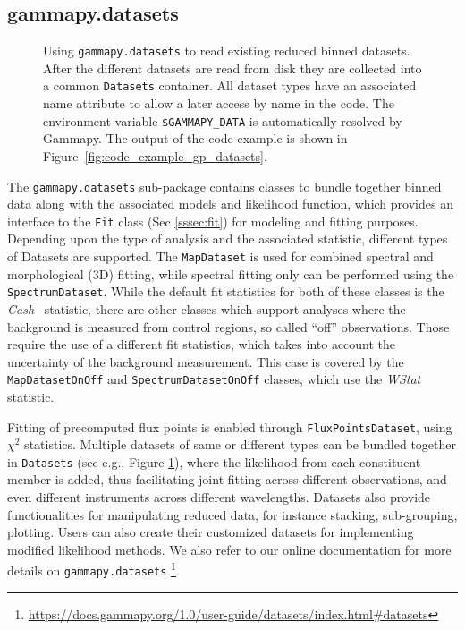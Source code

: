 \documentclass[longauth]{aa}
\newcommand{\code}[1]{\texttt{#1}}
\newcommand{\gammapy}{Gammapy\xspace}
\begin{document}
\subsection{gammapy.datasets}
\label{ssec:gammapy-datasets}
%
\begin{figure}
        \small
        \caption{
        Using \code{gammapy.datasets} to read existing reduced binned datasets.
        After the different datasets are read from disk they are collected into a
        common \code{Datasets} container. All dataset types have an associated
        name attribute to allow a later access by name in the code. The
        environment variable \code{\$GAMMAPY\_DATA} is automatically resolved
        by \gammapy. The output
                of the code example is shown in Figure~\ref{fig:code_example_gp_datasets}.
    }
        \label{fig*:minted:gp_datasets}
\end{figure}
%
The \code{gammapy.datasets} sub-package contains classes to bundle
together binned data along with the associated models and likelihood function, which
provides an interface to the \code{Fit} class (Sec \ref{sssec:fit}) for
modeling and fitting purposes. Depending upon the type of analysis and the
associated statistic, different types of Datasets are supported. The \code{MapDataset} is
used for combined spectral and morphological (3D) fitting, while spectral 
fitting only can be performed using the \code{SpectrumDataset}.
While the default fit statistics for both of these classes is the \emph{Cash}~\citep{Cash}
statistic, there are other classes which support
analyses where the background is measured from control regions, so called \enquote{off} observations.
Those require the use of a different fit statistics, which takes into account the
uncertainty of the background measurement. This case is covered by the \code{MapDatasetOnOff}
and \code{SpectrumDatasetOnOff} classes, which use the \emph{WStat}~\citep{WStat} statistic.

Fitting of precomputed flux points is enabled through \code{FluxPointsDataset},
using \emph{$\chi^2$} statistics. Multiple datasets of same or different types can be
bundled together in \code{Datasets} (see e.g., Figure \ref{fig*:minted:gp_datasets}),
where the likelihood from each constituent member is added, thus facilitating
joint fitting across different observations, and even different instruments
across different wavelengths. Datasets also provide functionalities for
manipulating reduced data, for instance stacking, sub-grouping, plotting. Users can
also create their customized datasets for implementing modified likelihood
methods. We also refer to our online documentation for more details on \code{gammapy.datasets}
\footnote{\url{https://docs.gammapy.org/1.0/user-guide/datasets/index.html\#datasets}}.
\end{document}
